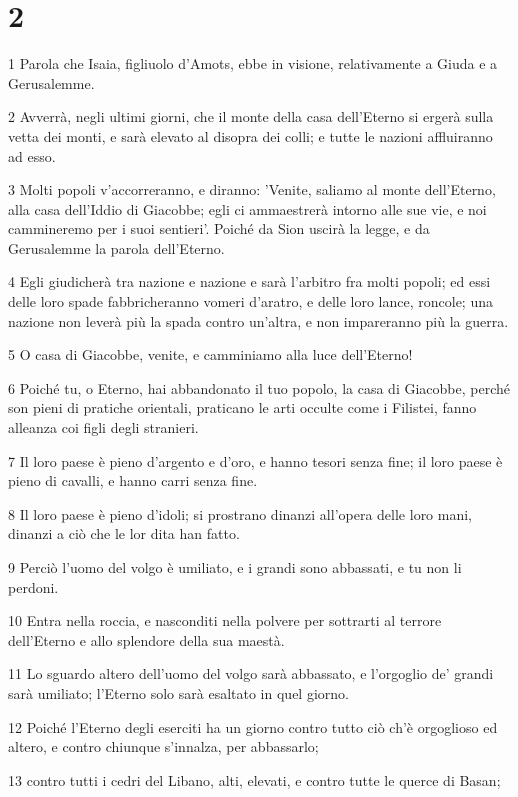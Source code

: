 \chapter{2}

\par 1 Parola che Isaia, figliuolo d'Amots, ebbe in visione, relativamente a Giuda e a Gerusalemme.
\par 2 Avverrà, negli ultimi giorni, che il monte della casa dell'Eterno si ergerà sulla vetta dei monti, e sarà elevato al disopra dei colli; e tutte le nazioni affluiranno ad esso.
\par 3 Molti popoli v'accorreranno, e diranno: 'Venite, saliamo al monte dell'Eterno, alla casa dell'Iddio di Giacobbe; egli ci ammaestrerà intorno alle sue vie, e noi cammineremo per i suoi sentieri'. Poiché da Sion uscirà la legge, e da Gerusalemme la parola dell'Eterno.
\par 4 Egli giudicherà tra nazione e nazione e sarà l'arbitro fra molti popoli; ed essi delle loro spade fabbricheranno vomeri d'aratro, e delle loro lance, roncole; una nazione non leverà più la spada contro un'altra, e non impareranno più la guerra.
\par 5 O casa di Giacobbe, venite, e camminiamo alla luce dell'Eterno!
\par 6 Poiché tu, o Eterno, hai abbandonato il tuo popolo, la casa di Giacobbe, perché son pieni di pratiche orientali, praticano le arti occulte come i Filistei, fanno alleanza coi figli degli stranieri.
\par 7 Il loro paese è pieno d'argento e d'oro, e hanno tesori senza fine; il loro paese è pieno di cavalli, e hanno carri senza fine.
\par 8 Il loro paese è pieno d'idoli; si prostrano dinanzi all'opera delle loro mani, dinanzi a ciò che le lor dita han fatto.
\par 9 Perciò l'uomo del volgo è umiliato, e i grandi sono abbassati, e tu non li perdoni.
\par 10 Entra nella roccia, e nasconditi nella polvere per sottrarti al terrore dell'Eterno e allo splendore della sua maestà.
\par 11 Lo sguardo altero dell'uomo del volgo sarà abbassato, e l'orgoglio de' grandi sarà umiliato; l'Eterno solo sarà esaltato in quel giorno.
\par 12 Poiché l'Eterno degli eserciti ha un giorno contro tutto ciò ch'è orgoglioso ed altero, e contro chiunque s'innalza, per abbassarlo;
\par 13 contro tutti i cedri del Libano, alti, elevati, e contro tutte le querce di Basan;
